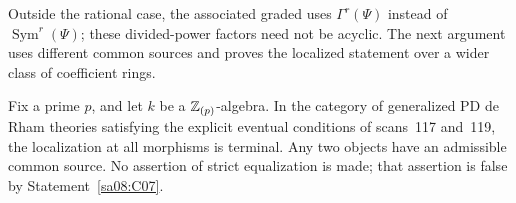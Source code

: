 Outside the rational case, the associated graded uses
$\Gamma^r(\Psi)$ instead of $\operatorname{Sym}^r(\Psi)$;
these divided-power factors need not be acyclic.
The next argument uses different common sources and proves the
localized statement over a wider class of coefficient rings.

\begin{theorem}\label{sa08:C09}
Fix a prime $p$, and let $k$ be a $\mathbb Z_{(p)}$-algebra. In the category
of generalized PD de Rham theories satisfying the explicit eventual
conditions of scans~117 and~119, the localization at all morphisms
is terminal. Any two objects have an admissible common source.
No assertion of strict equalization is made; that assertion is
false by Statement~\ref{sa08:C07}.
\end{theorem}
